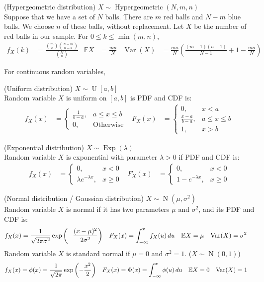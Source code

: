 \documentclass{huhtakm-template-book}
\newcommand{\expect}{\mathbb{E}}
\DeclareMathOperator{\Hypergeometric}{Hypergeometric}
\DeclareMathOperator{\U}{U}
\DeclareMathOperator{\Exp}{Exp}
\DeclareMathOperator{\N}{N}
\DeclareMathOperator{\Var}{Var}
\begin{document}
\newpage
\begin{seg}(Hypergeometric distribution) $X\sim\Hypergeometric(N,m,n)$\\
	Suppose that we have a set of $N$ balls. There are $m$ red balls and $N-m$ blue balls. We choose $n$ of these balls, without replacement. Let $X$ be the number of red balls in our sample. For $0\leq k\leq\min(m,n)$,
	\begin{align*}
		f_{X}(k)&=\frac{\binom{m}{k}\binom{N-m}{n-k}}{\binom{N}{n}} & \expect{X}&=\frac{mn}{N} & \Var(X)&=\frac{mn}{N}\left(\frac{(m-1)(n-1)}{N-1}+1-\frac{mn}{N}\right)
	\end{align*}
\end{seg}
For continuous random variables,
\begin{seg}(Uniform distribution) $X\sim\U[a,b]$\\
	Random variable $X$ is uniform on $[a,b]$ is PDF and CDF is:
	\begin{align*}
		f_{X}(x)&=\begin{cases}
			\frac{1}{b-a}, &a\leq x\leq b\\
			0, &\text{Otherwise}
		\end{cases} & F_{X}(x)&=\begin{cases}
			0, &x<a\\
			\frac{x-a}{b-a}, &a\leq x\leq b\\
			1, &x>b
		\end{cases}
	\end{align*}    
\end{seg}
\begin{seg}(Exponential distribution) $X\sim\Exp(\lambda)$\\
	Random variable $X$ is exponential with parameter $\lambda>0$ if PDF and CDF is:
	\begin{align*}
		f_{X}(x)&=\begin{cases}
			0, &x<0\\
			\lambda e^{-\lambda x}, &x\geq 0
		\end{cases} & F_{X}(x)&=\begin{cases}
			0, &x<0\\
			1-e^{-\lambda x}, &x\geq 0
		\end{cases}
	\end{align*}
\end{seg}
\begin{seg}(Normal distribution / Gaussian distribution) $X\sim\N(\mu,\sigma^{2})$\\
	Random variable $X$ is normal if it has two parameters $\mu$ and $\sigma^{2}$, and its PDF and CDF is:
	\begin{align*}
		f_{X}(x)&=\frac{1}{\sqrt{2\pi\sigma^{2}}}\exp\left(-\frac{(x-\mu)^{2}}{2\sigma^{2}}\right) & F_{X}(x)&=\intlu{-\infty}{x}f_{X}(u)\,du & \expect X&=\mu & \Var(X)&=\sigma^{2}
	\end{align*}
	Random variable $X$ is standard normal if $\mu=0$ and $\sigma^{2}=1$. ($X\sim\N(0,1)$)
	\begin{align*}
		f_{X}(x)&=\phi(x)=\frac{1}{\sqrt{2\pi}}\exp\left(-\frac{x^{2}}{2}\right) & F_{X}(x)&=\Phi(x)=\intlu{-\infty}{x}\phi(u)\,du & \expect X&=0 & \Var(X)&=1
	\end{align*}
\end{seg}
\end{document}
